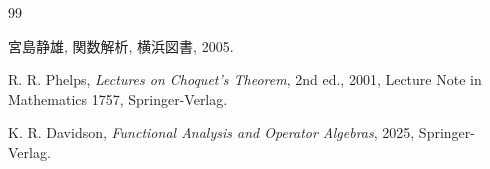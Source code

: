 \documentclass[leqno, a4paper, 12pt]{jsarticle}
\begin{document}
\begin{thebibliography}{99}


宮島静雄, 
関数解析, 
横浜図書, 2005. 

R. R. Phelps, 
\textit{Lectures on Choquet's Theorem}, 
2nd ed., 
2001, 
Lecture Note in Mathematics 1757, 
Springer-Verlag. 

K.  R. Davidson, 
\textit{Functional
Analysis
and Operator
Algebras}, 
2025, 
Springer-Verlag. 



\end{thebibliography}
\end{document}
